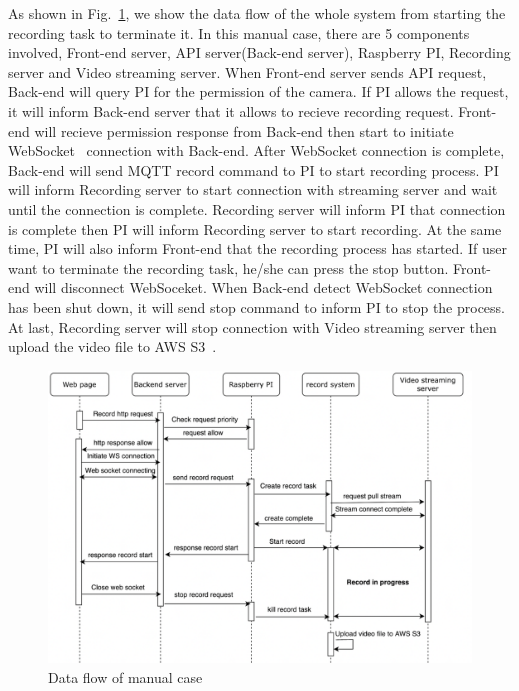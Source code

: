 As shown in Fig.~\ref{fig:manual-sequece-diagram}, we show the data flow of the whole system from starting the recording task to terminate it. In this manual case, there are 5 components involved, Front-end server, API server(Back-end server), Raspberry PI, Recording server and Video streaming server. When Front-end server sends API request, Back-end will query PI for the permission of the camera. If PI allows the request, it will inform Back-end server that it allows to recieve recording request. Front-end will recieve permission response from Back-end then start to initiate WebSocket~\cite{websocket} connection with Back-end. After WebSocket connection is complete, Back-end will send MQTT record command to PI to start recording process. PI will inform Recording server to start connection with streaming server and wait until the connection is complete. Recording server will inform PI that connection is complete then PI will inform Recording server to start recording. At the same time, PI will also inform Front-end that the recording process has started. If user want to terminate the recording task, he/she can press the stop button. Front-end will disconnect WebSoceket. When Back-end detect WebSocket connection has been shut down, it will send stop command to inform PI to stop the process. At last, Recording server will stop connection with Video streaming server then upload the video file to AWS S3~\cite{aws-s3}.

\begin{figure}[H]
    \centering
    \includegraphics[width=\textwidth]{figsrc/manual-sequece-diagram.png}
    \caption{Data flow of manual case\label{fig:manual-sequece-diagram}}
\end{figure}

